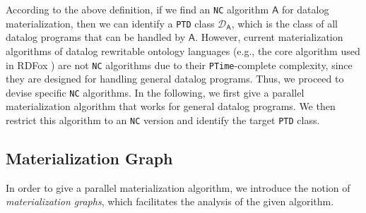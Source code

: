 According to the above definition, if we find an \texttt{NC} algorithm $\mathsf{A}$
for datalog materialization, then we can identify a \texttt{PTD} class $\mathcal{D}_{\mathsf{A}}$,
which is the class of all datalog programs that can be handled by $\mathsf{A}$.
However, current materialization algorithms of datalog rewritable ontology languages
(e.g., the core algorithm used in RDFox \cite{MotikNPHO14}) are not \texttt{NC} algorithms
due to their \texttt{PTime}-complete complexity, since they are
designed for handling general datalog programs. Thus, we proceed to
devise specific \texttt{NC} algorithms.
In the following, we first give a parallel materialization algorithm that works for
general datalog programs. We then restrict this algorithm to an \texttt{NC} version
and identify the target \texttt{PTD} class.


\subsection{Materialization Graph}

In order to give a parallel materialization algorithm,
we introduce the notion of \emph{materialization graphs}, which
facilitates the analysis of the given algorithm.


